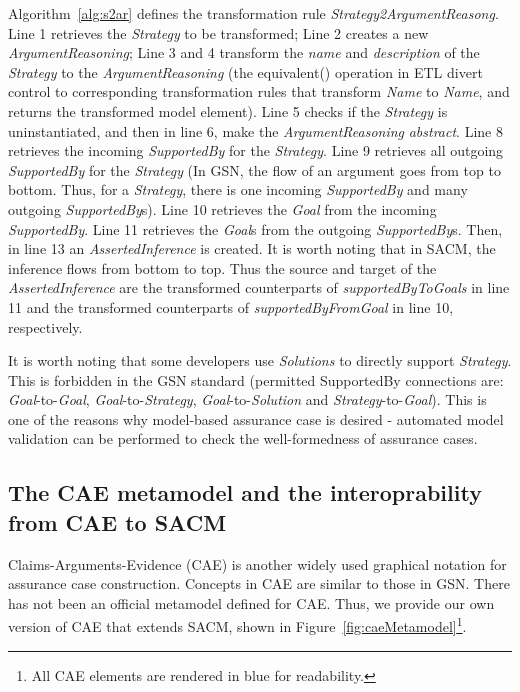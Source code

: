 Algorithm~\ref{alg:s2ar} defines the transformation rule \textit{Strategy2ArgumentReasong}. 
Line 1 retrieves the \textit{Strategy} to be transformed;
Line 2 creates a new \textit{ArgumentReasoning};
Line 3 and 4 transform the \textit{name} and \textit{description} of the \textit{Strategy} to the \textit{ArgumentReasoning} (the equivalent() operation in ETL divert control to corresponding transformation rules that transform \textit{Name} to \textit{Name}, and returns the transformed model element).
Line 5 checks if the \textit{Strategy} is uninstantiated, and then in line 6, make the \textit{ArgumentReasoning} \textit{abstract}.
Line 8 retrieves the incoming \textit{SupportedBy}  for the \textit{Strategy}.
Line 9 retrieves all outgoing \textit{SupportedBy} for the \textit{Strategy} (In GSN, the flow of an argument goes from top to bottom. Thus, for a \textit{Strategy}, there is one incoming \textit{SupportedBy} and many outgoing \textit{SupportedBy}s).
Line 10 retrieves the \textit{Goal} from the incoming \textit{SupportedBy}.
Line 11 retrieves the \textit{Goal}s from the outgoing \textit{SupportedBy}s. 
Then, in line 13 an \textit{AssertedInference} is created. 
It is worth noting that in SACM, the inference flows from bottom to top. Thus the source and target of the \textit{AssertedInference} are the transformed counterparts of \textit{supportedByToGoals} in line 11 and the transformed counterparts of \textit{supportedByFromGoal} in line 10, respectively.

It is worth noting that some developers use \textit{Solutions} to directly support \textit{Strategy}. 
This is forbidden in the GSN standard (permitted SupportedBy connections are: \textit{Goal}-to-\textit{Goal}, \textit{Goal}-to-\textit{Strategy}, \textit{Goal}-to-\textit{Solution} and \textit{Strategy}-to-\textit{Goal}). 
This is one of the reasons why model-based assurance case is desired - automated model validation can be performed to check the well-formedness of assurance cases.

\subsection{The CAE metamodel and the interoprability from CAE to SACM}
Claims-Arguments-Evidence (CAE) \cite{bishop2000methodology} is another widely used graphical notation for assurance case construction. 
Concepts in CAE are similar to those in GSN. 
There has not been an official metamodel defined for CAE. Thus, we provide our own version of CAE that extends SACM, shown in Figure~\ref{fig:caeMetamodel}\footnote{All CAE elements are rendered in blue for readability.}.


